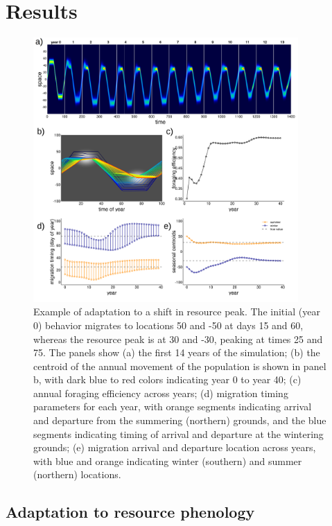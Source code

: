 \documentclass[utf8]{frontiersSCNS} %
\begin{document}
\section{Results}
	
	\begin{figure}
		\includegraphics[width = 0.9\textwidth]{figures/example1_adaptation_lettered.png}
		
		\caption{\label{fig_adaptation} Example of adaptation to a shift in resource peak. The initial (year 0) behavior migrates to locations 50 and -50 at days 15 and 60, whereas the resource peak is at 30 and -30, peaking at times 25 and 75. The panels show (a) the first 14 years of the simulation; (b) the centroid of the annual movement of the population is shown in panel b, with dark blue to red colors indicating year 0 to year 40; (c) annual foraging efficiency across years; (d) migration timing parameters for each year, with orange segments indicating arrival and departure from the summering (northern) grounds, and the blue segments indicating timing of arrival and departure at the wintering grounds; (e) migration arrival and departure location across years, with blue and orange indicating winter (southern) and summer (northern) locations.}
	\end{figure}
	
\subsection{Adaptation to resource phenology}\label{results_adaptation}
	
\end{document}
